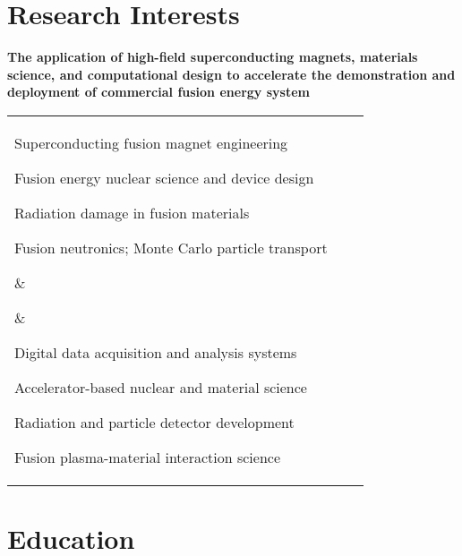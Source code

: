 \documentclass[10pt]{article}
\begin{document}
\section{Research Interests}
\textbf{The application of high-field superconducting magnets,
  materials science, and computational design to accelerate the
  demonstration and deployment of commercial fusion energy
  system \vspace{0.1cm}}\\
\begin{tabular}[t]{@{}p{\textwidth-\rcollength-\spacewidth}@{}p{\spacewidth}@{}p{\rcollength}}%

\parbox{\textwidth-\rcollength-\spacewidth}{%
  \begin{innerlist}
  \item Superconducting fusion magnet engineering
  \item Fusion energy nuclear science and device design
  \item Radiation damage in fusion materials
  \item Fusion neutronics; Monte Carlo particle transport
\end{innerlist}
}
& \parbox{\spacewidth}{\centering} &

\parbox{\rcollength}{%

\begin{innerlist}
\item Digital data acquisition and analysis systems
\item Accelerator-based nuclear and material science
\item Radiation and particle detector development
\item Fusion plasma-material interaction science
\end{innerlist}
}
\end{tabular}

\vspace{0.4cm}

\section{Education}
\end{document}
